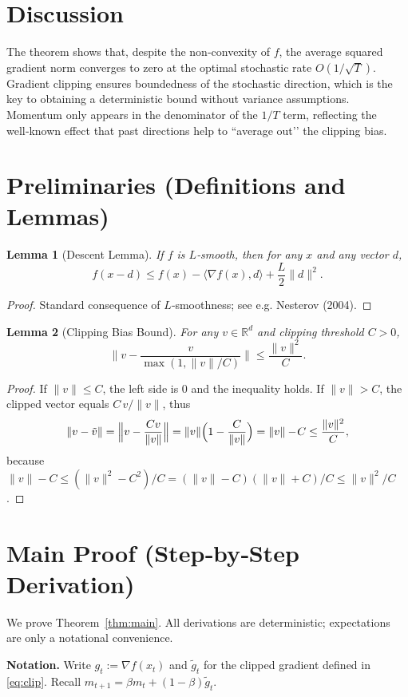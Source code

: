 \documentclass{article}
\newtheorem{lemma}{Lemma}
\newcommand{\R}{\mathbb{R}}
\newcommand{\ip}[2]{\langle #1,#2\rangle}
\begin{document}
\section*{Discussion}
The theorem shows that, despite the non‑convexity of $f$, the average squared gradient norm converges to zero at the optimal stochastic rate $O(1/\sqrt{T})$.  Gradient clipping ensures boundedness of the stochastic direction, which is the key to obtaining a deterministic bound without variance assumptions.  Momentum only appears in the denominator of the $1/T$ term, reflecting the well‑known effect that past directions help to “average out’’ the clipping bias.

\newpage
\section*{Preliminaries (Definitions and Lemmas)}
\begin{lemma}[Descent Lemma]\label{lem:descent}
If $f$ is $L$‑smooth, then for any $x$ and any vector $d$,
\[
f(x-d)\le f(x)-\ip{\nabla f(x)}{d}+\frac{L}{2}\|d\|^{2}.
\]
\end{lemma}
\begin{proof}
Standard consequence of $L$‑smoothness; see e.g. Nesterov (2004). \qedhere
\end{proof}

\begin{lemma}[Clipping Bias Bound]\label{lem:bias}
For any $v\in\R^{d}$ and clipping threshold $C>0$,
\[
\bigl\|v-\frac{v}{\max(1,\|v\|/C)}\bigr\|
\le \frac{\|v\|^{2}}{C}.
\]
\end{lemma}
\begin{proof}
If $\|v\|\le C$, the left side is $0$ and the inequality holds.
If $\|v\|>C$, the clipped vector equals $C\,v/\|v\|$, thus
\[
\|v-\tilde v\|=\Bigl\|v-\frac{C v}{\|v\|}\Bigr\|
  =\|v\|\Bigl(1-\frac{C}{\|v\|}\Bigr)=\|v\|-\!C
  \le\frac{\|v\|^{2}}{C},
\]
because $\|v\|-C\le (\|v\|^{2}-C^{2})/C=(\|v\|-C)(\|v\|+C)/C\le\|v\|^{2}/C$.
\qedhere
\end{proof}

\section*{Main Proof (Step‑by‑Step Derivation)}
We prove Theorem~\ref{thm:main}.  All derivations are deterministic; expectations are only a notational convenience.

\noindent\textbf{Notation.}  Write $g_{t}:=\nabla f(x_{t})$ and $\tilde g_{t}$ for the clipped gradient defined in \eqref{eq:clip}.  Recall $m_{t+1}= \beta m_{t}+(1-\beta)\tilde g_{t}$.
\end{document}
